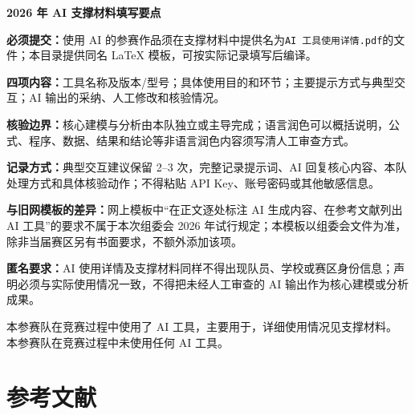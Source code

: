 \documentclass[withoutpreface,bwprint]{cumcmthesis}
\newif\ifmcmguidance
\newcommand{\MCMGuideField}[2]{\par\noindent\textbf{#1：}#2}
\newcommand{\MCMGuide}[7]{%
  \ifmcmguidance
    \begin{mcmguidebox}
      \small\color{black}
      {\color{mcmguidehead}\bfseries 写作指引}
      \MCMGuideField{目标}{#1}
      \MCMGuideField{必备清单}{#2}
      \MCMGuideField{语言风格}{#3}
      \MCMGuideField{篇幅与排版}{#4}
      \MCMGuideField{图表位置}{#5}
      \MCMGuideField{高分点}{#6}
      \MCMGuideField{错误警示}{#7}
    \end{mcmguidebox}
  \fi
}
\newcommand{\MCMReferenceLength}{参考文献检出 57/59，跨度 1 [1,11] 页受附件合并影响}
\begin{document}
  \begin{mcmguidebox}
    \small
    {\color{mcmguidehead}\bfseries 2026 年 AI 支撑材料填写要点}
    \MCMGuideField{必须提交}{使用 AI 的参赛作品须在支撑材料中提供名为\texttt{AI 工具使用详情.pdf}的文件；本目录提供同名 LaTeX 模板，可按实际记录填写后编译。}
    \MCMGuideField{四项内容}{工具名称及版本/型号；具体使用目的和环节；主要提示方式与典型交互；AI 输出的采纳、人工修改和核验情况。}
    \MCMGuideField{核验边界}{核心建模与分析由本队独立或主导完成；语言润色可以概括说明，公式、程序、数据、结果和结论等非语言润色内容须写清人工审查方式。}
    \MCMGuideField{记录方式}{典型交互建议保留 2--3 次，完整记录提示词、AI 回复核心内容、本队处理方式和具体核验动作；不得粘贴 API Key、账号密码或其他敏感信息。}
    \MCMGuideField{与旧网模板的差异}{网上模板中“在正文逐处标注 AI 生成内容、在参考文献列出 AI 工具”的要求不属于本次组委会 2026 年试行规定；本模板以组委会文件为准，除非当届赛区另有书面要求，不额外添加该项。}
    \MCMGuideField{匿名要求}{AI 使用详情及支撑材料同样不得出现队员、学校或赛区身份信息；声明必须与实际使用情况一致，不得把未经人工审查的 AI 输出作为核心建模或分析成果。}
  \end{mcmguidebox}
\else
  \ifdefined\MCMUsesAI
    本参赛队在竞赛过程中使用了 AI 工具，主要用于\MCMUseDescription，详细使用情况见支撑材料。
  \else
    本参赛队在竞赛过程中未使用任何 AI 工具。
  \fi
\fi

\section{参考文献}
\MCMGuide
  {完整、可追溯地列出正文实际使用的理论、算法、数据和软件来源。}
  {正文引用；作者/机构；题名；载体；年份；页码或 URL；访问日期。}
  {遵循统一著录格式，不把搜索结果、百科摘要或未阅读文献当一手来源。}
  {\MCMReferenceLength；只列正文引用条目，按引用顺序或统一规范排列。}
  {本节不插图表。}
  {关键定义和方法优先引用原始论文、教材、标准或官方资料。}
  {有条目无正文引用；引用键未定义；网页缺机构和访问日期。}
\ifmcmguidance
  \noindent [1] LaTeXStudio. CUMCMThesis: 全国大学生数学建模竞赛
  \LaTeX{} 模板[CP/OL].（格式示例）
\fi
\ifmcmguidance
  \begin{thebibliography}{9}
    \bibitem{template-source} 模板示例来源：将此条替换为正文实际引用的教材、算法原始论文、数据或软件文档。
  \end{thebibliography}
\fi

\appendix
\end{document}
